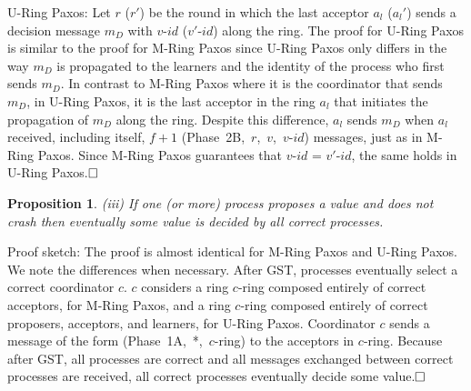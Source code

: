 \documentclass[final,3p,times,twocolumn,authoryear]{elsarticle}
\newtheorem{props}{Proposition}
\begin{document}
U-Ring Paxos: Let $r$ ($r'$) be the round in which the last acceptor $a_l$ ($a_l'$) sends a decision message $m_D$ with $v$-$id$ ($v'$-$id$) along the ring.
The proof for U-Ring Paxos is similar to the proof for M-Ring Paxos since U-Ring Paxos only differs in the way $m_D$ is propagated to the learners and the identity of the process who first sends $m_D$. In contrast to M-Ring Paxos where it is the coordinator that sends $m_D$, in U-Ring Paxos, it is the last acceptor in the ring $a_l$ that initiates the propagation of $m_D$ along the ring. Despite this difference, $a_l$ sends $m_D$ when $a_l$ received, including itself, $f+1$ (Phase~2B,~$r$,~$v$,~$v$-$id$) messages, just as in M-Ring Paxos. Since M-Ring Paxos guarantees that $v$-$id$ = $v'$-$id$, the same holds in U-Ring Paxos.$\hfill\square$
\vspace{1mm}
\begin{props}
(iii)  If one (or more) process proposes a value and does not crash then eventually some value is decided by all correct processes.
\end{props}
\vspace{1mm}
\noindent Proof sketch: The proof is almost identical for M-Ring Paxos and U-Ring Paxos. We note the differences when necessary. After GST, processes eventually select a correct coordinator $c$. $c$ considers a ring $c$-ring composed entirely of correct acceptors, for M-Ring Paxos, and a ring $c$-ring composed entirely of correct proposers, acceptors, and learners, for U-Ring Paxos. Coordinator $c$ sends a message of the form (Phase~1A,~*,~$c$-ring) to the acceptors in $c$-ring. Because after GST, all processes are correct and all messages exchanged between correct processes are received, all correct processes eventually decide some value.$\hfill\square$
 
\end{document}

